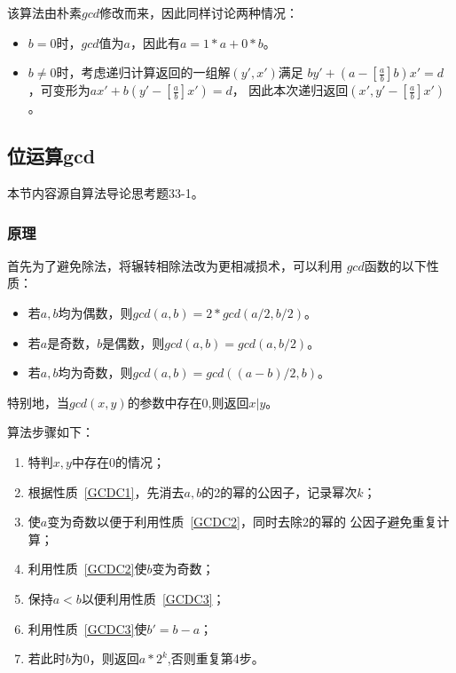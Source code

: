 该算法由朴素$gcd$修改而来，因此同样讨论两种情况：

\begin{itemize}
    \item $b=0$时，$gcd$值为$a$，因此有$a=1*a+0*b$。
    \item $b\neq 0$时，考虑递归计算返回的一组解$(y',x')$满足
    $by'+(a-[\frac{a}{b}]b)x'=d$，可变形为$ax'+b(y'-[\frac{a}{b}]x')=d$，
    因此本次递归返回$(x',y'-[\frac{a}{b}]x')$。
\end{itemize}

\subsection{位运算gcd}

本节内容源自算法导论\cite{ITA3}思考题33-1。

\subsubsection{原理}

首先为了避免除法，将辗转相除法改为更相减损术，可以利用
$gcd$函数的以下性质：

\begin{itemize}
    \item \begin{character}\label{GCDC1}
        若$a,b$均为偶数，则$gcd(a,b)=2*gcd(a/2,b/2)$。
    \end{character}
    \item \begin{character}\label{GCDC2}
        若$a$是奇数，$b$是偶数，则$gcd(a,b)=gcd(a,b/2)$。
    \end{character}
    \item \begin{character}\label{GCDC3}
        若$a,b$均为奇数，则$gcd(a,b)=gcd((a-b)/2,b)$。
    \end{character}
\end{itemize}

特别地，当$gcd(x,y)$的参数中存在0,则返回$x|y$。

算法步骤如下：
\begin{enumerate}
    \item 特判$x,y$中存在0的情况；
    \item 根据性质~\ref{GCDC1}，先消去$a,b$的2的幂的公因子，记录幂次$k$；
    \item 使$a$变为奇数以便于利用性质~\ref{GCDC2}，同时去除2的幂的
    公因子避免重复计算；
    \item 利用性质~\ref{GCDC2}使$b$变为奇数；
    \item 保持$a<b$以便利用性质~\ref{GCDC3}；
    \item 利用性质~\ref{GCDC3}使$b'=b-a$；
    \item 若此时$b$为0，则返回$a*2^k$,否则重复第4步。
\end{enumerate}

